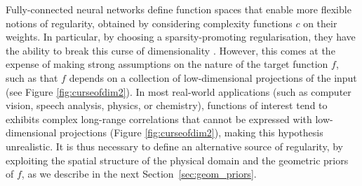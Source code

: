 



Fully-connected neural networks define function spaces that enable more flexible notions of regularity, obtained by considering complexity functions $c$ on their weights. In particular, by choosing a sparsity-promoting regularisation, they have the ability to break this curse of dimensionality \citep{bach2017breaking}. However, this comes at the expense of making strong assumptions on the nature of the target function $f$, such as that $f$ depends on a collection of low-dimensional projections of the input (see Figure \ref{fig:curseofdim2}).
In most real-world applications (such as computer vision, speech analysis, physics, or  chemistry), functions of interest %
tend to exhibits complex long-range correlations that cannot be expressed with low-dimensional projections (Figure \ref{fig:curseofdim2}), making this hypothesis unrealistic.  
It is thus necessary to define an alternative source of regularity, by exploiting the spatial structure of the physical domain and the geometric priors of $f$, as we describe in the next Section~\ref{sec:geom_priors}. 

